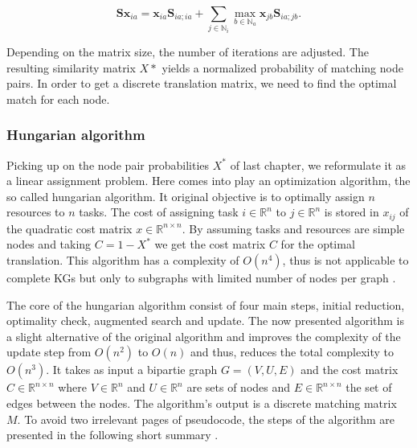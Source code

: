 {\begin{equation}
    \mathbf{Sx}_{i a}=\mathbf{x}_{i a} \mathbf{S}_{i a ; i a}+\sum_{j \in \mathbb{N}_{i}} \max _{b \in \mathbb{N}_{a}} \mathbf{x}_{j b} \mathbf{S}_{i a ; j b}.
\end{equation}

Depending on the matrix size, the number of iterations are adjusted. The resulting similarity matrix $X*$ yields a normalized probability of matching node pairs. In order to get a discrete translation matrix, we need to find the optimal match for each node.



\subsubsection{Hungarian algorithm}
\label{ssec3:hung}

Picking up on the node pair probabilities $X^*$ of last chapter, we reformulate it as a linear assignment problem. Here comes into play an optimization algorithm, the so called hungarian algorithm. It original objective is to optimally assign $n$ resources to $n$ tasks. The cost of assigning task $i \in \mathbb{R}^n$ to $j \in \mathbb{R}^n$ is stored in $x_{ij}$ of the quadratic cost matrix $x \in \mathbb{R}^{n \times n}$. By assuming tasks and resources are simple nodes and taking $C=1-X^*$ we get the cost matrix $C$ for the optimal translation. This algorithm has a complexity of $O\left(n^{4}\right)$, thus is not applicable to complete KGs but only to subgraphs with limited number of nodes per graph \cite{date_gpu-accelerated_2016}.

The core of the hungarian algorithm consist of four main steps, initial reduction, optimality check, augmented search and update. The now presented algorithm is a slight alternative of the original algorithm and improves the complexity of the update step from $O\left(n^{2}\right)$ to $O\left(n\right)$ and thus, reduces the total complexity to $O\left(n^{3}\right)$. It takes as input a bipartie graph $G=(V, U, E)$ and the cost matrix $C \in \mathbb{R}^{n \times n}$ where $V \in \mathbb{R}^n$ and $U \in \mathbb{R}^n$ are sets of nodes and $E \in \mathbb{R}^{n \times n}$ the set of edges between the nodes. The algorithm's output is a discrete matching matrix $M$. To avoid two irrelevant pages of pseudocode, the steps of the algorithm are presented in the following short summary \cite{mills2007dynamic}.

}
